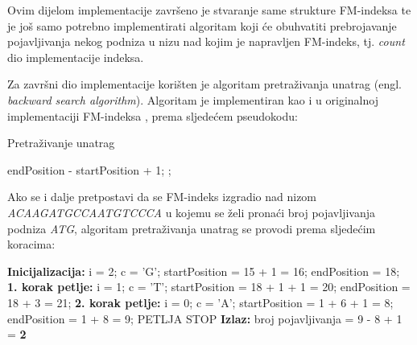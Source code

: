 Ovim dijelom implementacije završeno je stvaranje same strukture FM-indeksa te je još samo potrebno implementirati algoritam koji će obuhvatiti prebrojavanje pojavljivanja nekog podniza u nizu nad kojim je napravljen FM-indeks, tj. \emph{count} dio implementacije indeksa.

Za završni dio implementacije korišten je algoritam pretraživanja unatrag (engl. \emph{backward search algorithm}). Algoritam je implementiran kao i u originalnoj implementaciji FM-indeksa \cite{fm1}, prema sljedećem pseudokodu:


\begin{algorithm}
\caption{ Pretraživanje unatrag }
\label{algo:bws}
\begin{algorithmic}
\ENDFOR
{}
\RETURN endPosition - startPosition + 1;
\ELSE
{};
\ENDIF
\end{algorithmic}
\end{algorithm}


\vspace{3 mm}

Ako se i dalje pretpostavi da se FM-indeks izgradio nad nizom \emph{ACAAGATGCCAATGTCCCA}  u kojemu se želi pronaći broj pojavljivanja podniza \emph{ATG}, algoritam pretraživanja unatrag se provodi prema sljedećim koracima:

\vspace{2 mm}

\textbf{Inicijalizacija:} \newline
i = 2; \newline
c = 'G'; \newline
startPosition = 15 + 1 = 16; \newline
endPosition = 18; \newline
\newline
\textbf{1. korak petlje:} \newline
i = 1; \newline
c = 'T'; \newline
startPosition  = 18 + 1 + 1 = 20; \newline
endPosition = 18 + 3 = 21; \newline
\newline
\textbf{2. korak petlje:} \newline
i = 0; \newline
c = 'A'; \newline
startPosition  = 1 + 6 + 1 = 8; \newline
endPosition = 1 + 8 = 9; \newline
PETLJA STOP \newline
 \newline
\textbf{Izlaz:} broj pojavljivanja = 9 - 8 + 1 = \textbf{2} 


